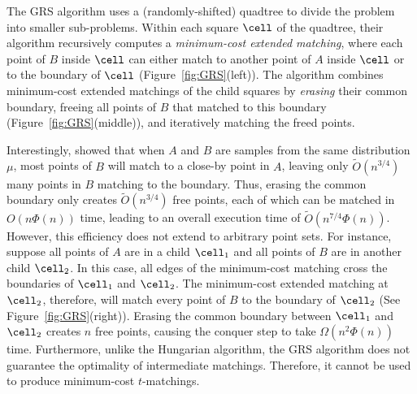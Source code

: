 The GRS algorithm uses a (randomly-shifted) quadtree to divide the problem into smaller sub-problems. Within each square $\cell$ of the quadtree, their algorithm recursively computes a \emph{minimum-cost extended matching}, where each point of $B$ inside $\cell$ can either match to another point of $A$ inside $\cell$ or to the boundary of $\cell$ (Figure~\ref{fig:GRS}(left)). The algorithm combines minimum-cost extended matchings of the child squares by  \emph{erasing} their common boundary, freeing all points of $B$ that matched to this boundary (Figure~\ref{fig:GRS}(middle)), and iteratively matching the freed points. 

Interestingly, \citet{gattani2023robust} showed that when $A$ and $B$ are samples from the same distribution $\mu$, most points of $B$ will match to a close-by point in $A$, leaving only $\tilde{O}(n^{3/4})$ many points in $B$ matching to the boundary. Thus, erasing the common boundary only creates $\tilde{O}(n^{3/4})$ free points, each of which can be matched in $O(n\Phi(n))$ time, leading to an overall execution time of $\tilde{O}(n^{7/4}\Phi(n))$. However, this efficiency does not extend to arbitrary point sets. For instance, suppose all points of $A$ are in a child $\cell_1$ and all points of $B$ are in another child $\cell_2$. In this case, all edges of the minimum-cost matching cross the boundaries of $\cell_1$ and $\cell_2$. The minimum-cost extended matching at $\cell_2$, therefore, will match every point of $B$ to the boundary of $\cell_2$ (See Figure~\ref{fig:GRS}(right)). Erasing the common boundary between $\cell_1$ and $\cell_2$ creates $n$ free points, causing the conquer step to take $\Omega(n^2\Phi(n))$ time. Furthermore, unlike the Hungarian algorithm, the GRS algorithm does not guarantee the optimality of intermediate matchings. Therefore, it cannot be used to produce minimum-cost $t$-matchings. 







